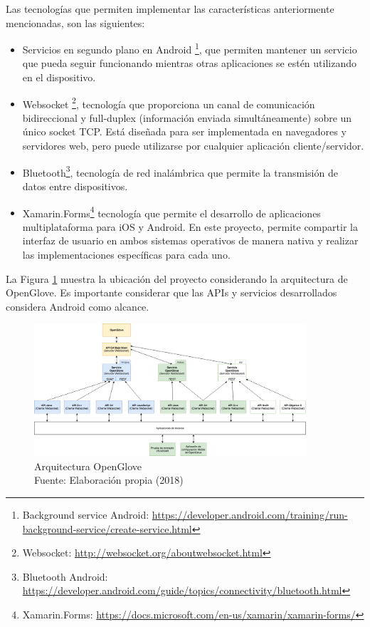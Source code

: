 Las tecnologías que permiten implementar las características anteriormente mencionadas, son las siguientes:
\begin{itemize}

\item Servicios en segundo plano en Android \footnote{Background service Android: \url{https://developer.android.com/training/run-background-service/create-service.html}}, que permiten mantener un servicio que pueda seguir funcionando mientras otras aplicaciones se estén utilizando en el dispositivo.

\item Websocket \footnote{Websocket: \url{http://websocket.org/aboutwebsocket.html}}, tecnología que proporciona un canal de comunicación bidireccional y full-duplex (información enviada simultáneamente) sobre un único socket TCP. Está diseñada para ser implementada en navegadores y servidores web, pero puede utilizarse por cualquier aplicación cliente/servidor.

\item Bluetooth\footnote{Bluetooth Android: \url{https://developer.android.com/guide/topics/connectivity/bluetooth.html}}, tecnología de red inalámbrica que permite la transmisión de datos entre dispositivos.

\item Xamarin.Forms\footnote{Xamarin.Forms: \url{https://docs.microsoft.com/en-us/xamarin/xamarin-forms/}} tecnología que permite el desarrollo de aplicaciones multiplataforma para iOS y Android. En este proyecto, permite compartir la interfaz de usuario en ambos sistemas operativos de manera nativa y realizar las implementaciones específicas para cada uno.

\end{itemize}

La Figura \ref{fig:propuesta-arquitectura-open-glove} muestra la ubicación del proyecto considerando la arquitectura de OpenGlove. Es importante considerar que las APIs y servicios desarrollados considera Android como alcance.

\begin{figure}[H]
  \begin{center} 
   	\includegraphics[width=0.9\textwidth]{images/chapter01/OpenGlove-Architecture-02.png} 
    \caption[Arquitectura Openglove]{Arquitectura OpenGlove \\Fuente: Elaboración propia (2018)}
    \label{fig:propuesta-arquitectura-open-glove}
  \end{center}
\end{figure}

